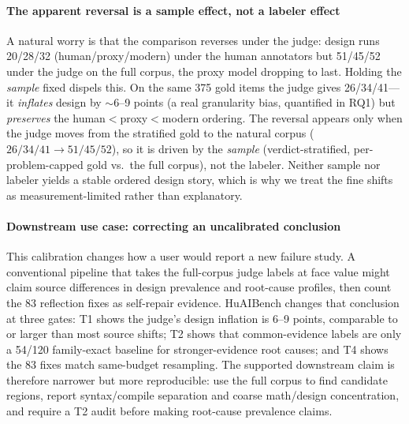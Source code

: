\documentclass[conference]{IEEEtran}
\begin{document}
\paragraph{The apparent reversal is a sample effect, not a labeler effect}
A natural worry is that the comparison reverses under the judge: design runs
20/28/32 (human/proxy/modern) under the human annotators but 51/45/52 under the judge
on the full corpus, the proxy model dropping to last. Holding the \emph{sample} fixed
dispels this. On the same 375 gold items the judge gives
26/34/41---it \emph{inflates} design by $\sim$6--9 points (a real granularity bias,
quantified in RQ1) but \emph{preserves} the human$<$proxy$<$modern ordering. The
reversal appears only when the judge moves from the stratified gold to the natural
corpus ($26/34/41\!\to\!51/45/52$), so it is driven by the \emph{sample}
(verdict-stratified, per-problem-capped gold vs.\ the full corpus), not the labeler.
Neither sample nor labeler yields a stable ordered design story, which is why we
treat the fine shifts as measurement-limited rather than explanatory.

\paragraph{Downstream use case: correcting an uncalibrated conclusion}
This calibration changes how a user would report a new failure study. A conventional
pipeline that takes the full-corpus judge labels at face value might claim source
differences in design prevalence and root-cause profiles, then count the 83 reflection
fixes as self-repair evidence. HuAIBench changes that conclusion at three gates:
T1 shows the judge's design inflation is 6--9 points, comparable to or larger than
most source shifts; T2 shows that common-evidence labels are only a 54/120
family-exact baseline for stronger-evidence root causes; and T4 shows the 83 fixes
match same-budget resampling. The supported downstream claim is therefore narrower
but more reproducible: use the full corpus to find candidate regions, report
syntax/compile separation and coarse math/design concentration, and require a T2
audit before making root-cause prevalence claims.
\end{document}
